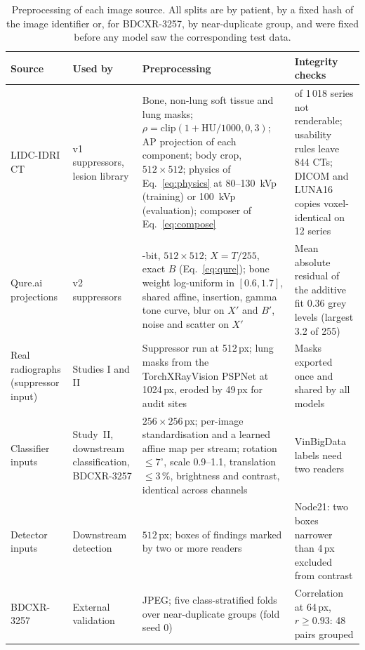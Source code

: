\begin{table}[!t]
\centering
\caption{Preprocessing of each image source. All splits are by patient, by a fixed hash of the image identifier or, for BDCXR-3257, by
near-duplicate group, and were fixed before any model saw the corresponding test data.}
\label{tab:preproc}
\footnotesize
\renewcommand{\arraystretch}{1.1}
\setlength{\tabcolsep}{3pt}
\begin{tabularx}{\textwidth}{@{}>{\raggedright\arraybackslash}p{3.0cm}>{\raggedright\arraybackslash}p{3.0cm}%
>{\raggedright\arraybackslash}X>{\raggedright\arraybackslash}p{3.4cm}@{}}
\toprule
Source & Used by & Preprocessing & Integrity checks \\
\midrule
LIDC-IDRI CT & v1 suppressors, lesion library & Bone, non-lung soft tissue and lung masks; $\rho=\mathrm{clip}(1+\mathrm{HU}/1000,0,3)$; AP
 projection of each component; body crop, $512\times512$; physics of Eq.~\eqref{eq:physics} at 80--130~kVp (training) or 100~kVp
 (evaluation); composer of Eq.~\eqref{eq:compose} & 18 of 1\,018 series not renderable; usability rules leave 844 CTs; DICOM and LUNA16
 copies voxel-identical on 12 series\\
Qure.ai projections & v2 suppressors & 8-bit, $512\times512$; $X=T/255$, exact $B$ (Eq.~\eqref{eq:qure}); bone weight log-uniform in
 $[0.6,1.7]$, shared affine, insertion, gamma tone curve, blur on $X'$ and $B'$, noise and scatter on $X'$ & Mean absolute residual of the
 additive fit 0.36 grey levels (largest 3.2 of 255)\\
Real radiographs (suppressor input) & Studies I and II & Suppressor run at 512\,px; lung masks from the TorchXRayVision PSPNet at
 1024\,px, eroded by 49\,px for audit sites & Masks exported once and shared by all models\\
Classifier inputs & Study~II, downstream classification, BDCXR-3257 & $256\times256$\,px; per-image standardisation and a learned affine
 map per stream; rotation $\le7^\circ$, scale 0.9--1.1, translation $\le3$\,\%, brightness and contrast, identical across channels &
 VinBigData labels need two readers\\
Detector inputs & Downstream detection & $512$\,px; boxes of findings marked by two or more readers & Node21: two boxes narrower than 4\,px
 excluded from contrast\\
BDCXR-3257 & External validation & JPEG; five class-stratified folds over near-duplicate groups (fold seed 0) & Correlation at 64\,px,
 $r\ge0.93$: 48 pairs grouped\\
\bottomrule
\end{tabularx}
\end{table}


